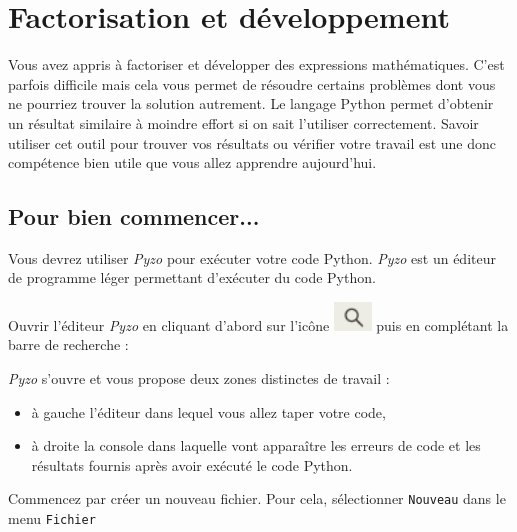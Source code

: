 \chapter{Factorisation et développement}

Vous avez appris à factoriser et développer des expressions mathématiques. C'est parfois difficile mais cela vous permet de résoudre certains problèmes dont vous ne pourriez trouver la solution autrement. Le langage Python permet d'obtenir un résultat similaire à moindre effort si on sait l'utiliser correctement. Savoir utiliser cet outil pour trouver vos résultats ou vérifier votre travail est une donc compétence bien utile que vous allez apprendre aujourd'hui.\\

\section{Pour bien commencer...}

Vous devrez utiliser \emph{Pyzo} pour exécuter votre code Python. \emph{Pyzo} est un éditeur de programme léger permettant d'exécuter du code Python. 

Ouvrir l'éditeur \emph{Pyzo} en cliquant d'abord sur l'icône \includegraphics[width=1cm]{./images/activite7/icone_recherche} puis en complétant la barre de recherche : 


\emph{Pyzo} s'ouvre et vous propose deux zones distinctes de travail :
\begin{itemize}
\item à gauche l'éditeur dans lequel vous allez taper votre code,
\item à droite la console dans laquelle vont apparaître les erreurs de code et les résultats fournis après avoir exécuté le code Python.
\end{itemize}




Commencez par créer un nouveau fichier. Pour cela, sélectionner \texttt{Nouveau} dans le menu \texttt{Fichier}


